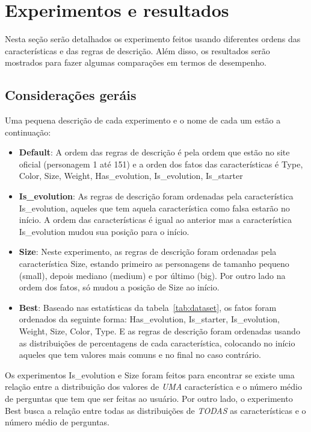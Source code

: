 \section{Experimentos e resultados}
\label{sec:experiments}

Nesta seção serão detalhados os experimento feitos usando diferentes ordens das características e das regras de descrição. Além disso, os resultados serão mostrados para fazer algumas comparações em termos de desempenho.

\subsection{Considerações geráis}
\label{subsec:setup}
Uma pequena descrição de cada experimento e o nome de cada um estão a continuação:
	\begin{itemize}
		\item \textbf{Default}: A ordem das regras de descrição é pela ordem que estão no site oficial (personagem 1 até 151) e a orden dos fatos das características é Type, Color, Size, Weight, Has\_evolution, Is\_evolution, Is\_starter
		\item \textbf{Is\_evolution}: As regras de descrição foram ordenadas pela característica Is\_evolution, aqueles que tem aquela característica como falsa estarão no início. A ordem das características é igual ao anterior mas a característica Is\_evolution mudou sua posição para o início.
		\item \textbf{Size}: Neste experimento, as regras de descrição foram ordenadas pela característica Size, estando primeiro as personagens de tamanho pequeno (small), depois mediano (medium) e por último (big). Por outro lado na ordem dos fatos, só mudou a posição de Size ao início.
		\item \textbf{Best}: Baseado nas estatísticas da tabela~\ref{tab:dataset}, os fatos foram ordenados da seguinte forma: Has\_evolution, Is\_starter, Is\_evolution, Weight, Size, Color, Type. E as regras de descrição foram ordenadas usando as distribuições de percentagens de cada característica, colocando no início aqueles que tem valores mais comuns e no final no caso contrário.
	\end{itemize}
	Os experimentos Is\_evolution e Size foram feitos para encontrar se existe uma relação entre a distribuição dos valores de \emph{UMA} característica e o número médio de perguntas que tem que ser feitas ao usuário. Por outro lado, o experimento Best busca a relação entre todas as distribuições de \emph{TODAS} as características e o número médio de perguntas.

